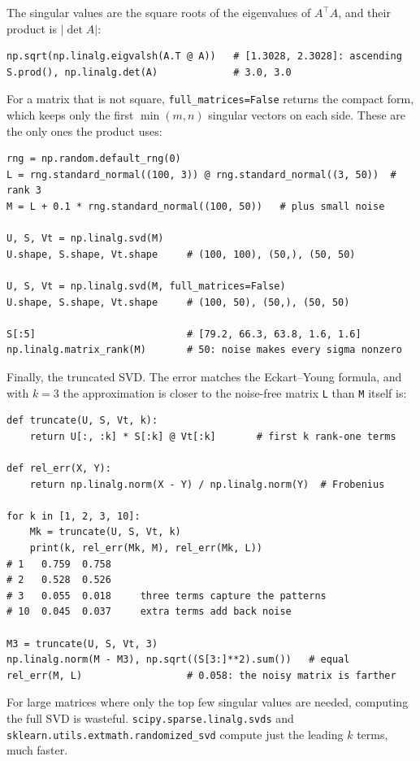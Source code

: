 The singular values are the square roots of the eigenvalues of
$A^\top A$, and their product is $|\det A|$:

\begin{lstlisting}
np.sqrt(np.linalg.eigvalsh(A.T @ A))   # [1.3028, 2.3028]: ascending
S.prod(), np.linalg.det(A)             # 3.0, 3.0
\end{lstlisting}

For a matrix that is not square, \texttt{full\_matrices=False} returns the
compact form, which keeps only the first $\min(m, n)$ singular vectors on
each side. These are the only ones the product uses:

\begin{lstlisting}
rng = np.random.default_rng(0)
L = rng.standard_normal((100, 3)) @ rng.standard_normal((3, 50))  # rank 3
M = L + 0.1 * rng.standard_normal((100, 50))   # plus small noise

U, S, Vt = np.linalg.svd(M)
U.shape, S.shape, Vt.shape     # (100, 100), (50,), (50, 50)

U, S, Vt = np.linalg.svd(M, full_matrices=False)
U.shape, S.shape, Vt.shape     # (100, 50), (50,), (50, 50)

S[:5]                          # [79.2, 66.3, 63.8, 1.6, 1.6]
np.linalg.matrix_rank(M)       # 50: noise makes every sigma nonzero
\end{lstlisting}

Finally, the truncated SVD. The error matches the Eckart--Young formula,
and with $k = 3$ the approximation is closer to the noise-free matrix
\texttt{L} than \texttt{M} itself is:

\begin{lstlisting}
def truncate(U, S, Vt, k):
    return U[:, :k] * S[:k] @ Vt[:k]       # first k rank-one terms

def rel_err(X, Y):
    return np.linalg.norm(X - Y) / np.linalg.norm(Y)  # Frobenius

for k in [1, 2, 3, 10]:
    Mk = truncate(U, S, Vt, k)
    print(k, rel_err(Mk, M), rel_err(Mk, L))
# 1   0.759  0.758
# 2   0.528  0.526
# 3   0.055  0.018     three terms capture the patterns
# 10  0.045  0.037     extra terms add back noise

M3 = truncate(U, S, Vt, 3)
np.linalg.norm(M - M3), np.sqrt((S[3:]**2).sum())   # equal
rel_err(M, L)                  # 0.058: the noisy matrix is farther
\end{lstlisting}

For large matrices where only the top few singular values are needed,
computing the full SVD is wasteful. \texttt{scipy.sparse.linalg.svds} and
\texttt{sklearn.utils.extmath.randomized\_svd} compute just the leading
$k$ terms, much faster.

